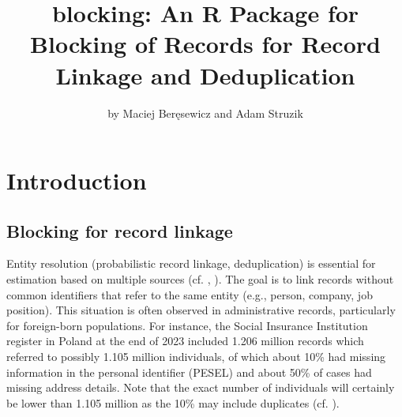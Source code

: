 \title{blocking: An R Package for Blocking of Records for Record Linkage and Deduplication}


\author{by Maciej Beręsewicz and Adam Struzik}

\maketitle


\section{Introduction}\label{introduction}

\subsection{Blocking for record linkage}\label{blocking-for-record-linkage}

Entity resolution (probabilistic record linkage, deduplication) is
essential for estimation based on multiple sources (cf.
\citet{fellegi1969theory}, \citet{Binette2022}). The goal is to link records without
common identifiers that refer to the same entity (e.g., person, company,
job position). This situation is often observed in administrative
records, particularly for foreign-born populations. For instance, the
Social Insurance Institution register in Poland at the end of 2023
included 1.206 million records which referred to possibly 1.105 million
individuals, of which about 10\% had missing information in the personal
identifier (PESEL) and about 50\% of cases had missing address details.
Note that the exact number of individuals will certainly be lower than
1.105 million as the 10\% may include duplicates (cf.
\citet{beresewicz2025estimation}).

